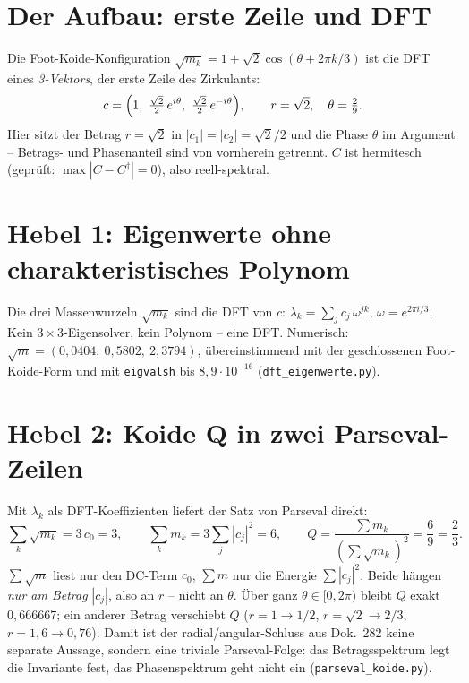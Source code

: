 \section{Der Aufbau: erste Zeile und DFT}
Die Foot-Koide-Konfiguration $\sqrt{m_k}=1+\sqrt2\cos(\theta+2\pi k/3)$ ist die DFT eines
\emph{3-Vektors}, der erste Zeile des Zirkulants:
\[
  c=\Bigl(1,\ \tfrac{\sqrt2}{2}\,e^{i\theta},\ \tfrac{\sqrt2}{2}\,e^{-i\theta}\Bigr),
  \qquad r=\sqrt2,\quad \theta=\tfrac{2}{9}.
\]
Hier sitzt der Betrag $r=\sqrt2$ in $|c_1|=|c_2|=\sqrt2/2$ und die Phase $\theta$ im Argument --
Betrags- und Phasenanteil sind von vornherein getrennt. $C$ ist hermitesch (geprüft:
$\max|C-C^{\dagger}|=0$), also reell-spektral.

\section{Hebel 1: Eigenwerte ohne charakteristisches Polynom}
Die drei Massenwurzeln $\sqrt{m_k}$ sind die DFT von $c$:
$\lambda_k=\sum_{j}c_j\,\omega^{jk}$, $\omega=e^{2\pi i/3}$. Kein $3\times3$-Eigensolver, kein
Polynom -- eine DFT. Numerisch: $\sqrt m=(0{,}0404,\ 0{,}5802,\ 2{,}3794)$, übereinstimmend mit der
geschlossenen Foot-Koide-Form und mit \texttt{eigvalsh} bis $8{,}9\cdot10^{-16}$
(\texttt{dft\_eigenwerte.py}).

\section{Hebel 2: Koide Q in zwei Parseval-Zeilen}
Mit $\lambda_k$ als DFT-Koeffizienten liefert der Satz von Parseval direkt:
\[
  \sum_k \sqrt{m_k}=3\,c_0=3,\qquad \sum_k m_k=3\sum_j|c_j|^2=6,
  \qquad Q=\frac{\sum m_k}{(\sum\sqrt{m_k})^2}=\frac{6}{9}=\frac{2}{3}.
\]
$\sum\sqrt m$ liest nur den DC-Term $c_0$, $\sum m$ nur die Energie $\sum|c_j|^2$. Beide hängen
\emph{nur am Betrag} $|c_j|$, also an $r$ -- nicht an $\theta$. Über ganz $\theta\in[0,2\pi)$ bleibt
$Q$ exakt $0{,}666667$; ein anderer Betrag verschiebt $Q$ ($r=1\!\to\!1/2$, $r=\sqrt2\!\to\!2/3$,
$r=1{,}6\!\to\!0{,}76$). Damit ist der radial/angular-Schluss aus Dok.~282 keine separate Aussage,
sondern eine triviale Parseval-Folge: das Betragsspektrum legt die Invariante fest, das
Phasenspektrum geht nicht ein (\texttt{parseval\_koide.py}).

